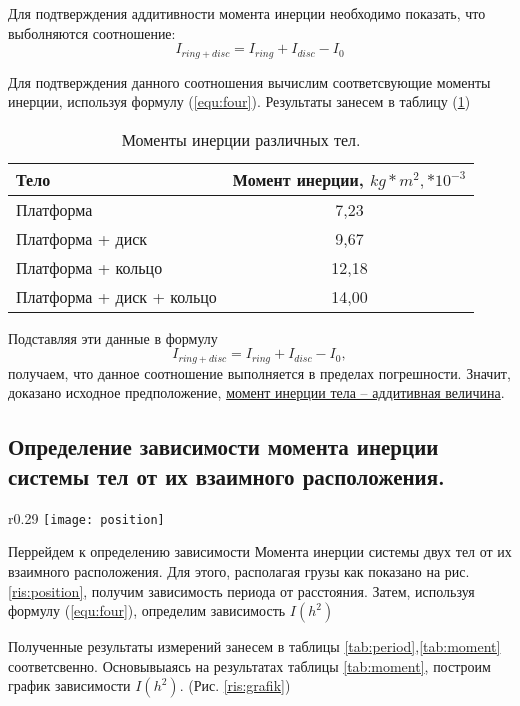 \documentclass[12pt,a4paper]{article}
\begin{document}
		Для подтверждения аддитивности момента инерции необходимо показать, что выболняются соотношение:
		$$ I_{ring + disc} = I_{ring} + I_{disc} - I_{0} $$
		
		Для подтверждения данного соотношения вычислим соответсвующие моменты инерции, используя формулу (\ref{equ:four}). Результаты занесем в таблицу (\ref{tab:moments})
		
		\begin{table}[h!]
			\begin{center}
				\begin{tabular}{| l | c |}
				\hline
				Тело & Момент инерции, $kg*m^{2}, * 10^{-3}$ \\ \hline
				Платформа & 7,23 \\ \hline
				Платформа + диск & 9,67 \\ \hline
				Платформа + кольцо & 12,18 \\ \hline
				Платформа + диск + кольцо & 14,00 \\ \hline
				\end{tabular}
				\caption{Моменты инерции различных тел.}
				\label{tab:moments}
			\end{center}					
		\end{table}
		
		Подставляя эти данные в формулу $$ I_{ring + disc} = I_{ring} + I_{disc} - I_{0}, $$ получаем, что данное соотношение выполняется в пределах погрешности. Значит, доказано исходное предположение, \underline{момент инерции тела -- аддитивная величина}.
		\newpage
		
	\subsection{Определение зависимости момента инерции системы тел от их взаимного расположения.}
		\begin{wrapfigure}[10]{r}{0.29\textwidth}
			\vspace{-3em}
			\texttt{[image: position]}
			\caption{Схема расположения грузов на платформе трифилярного подвеса.}
			\label{ris:position}
		\end{wrapfigure}
			
		Перрейдем к определению зависимости Момента инерции системы двух тел от их взаимного расположения. Для этого, располагая грузы как показано на рис. \ref{ris:position}, получим зависимость периода от расстояния. Затем, используя формулу (\ref{equ:four}), определим зависимость $ I(h^{2}) $
		
		Полученные результаты измерений занесем в таблицы \ref{tab:period},\ref{tab:moment} соответсвенно. Основывыаясь на результатах таблицы \ref{tab:moment}, построим график зависимости $ I(h^{2}) $. (Рис. \ref{ris:grafik})
		
\end{document}
